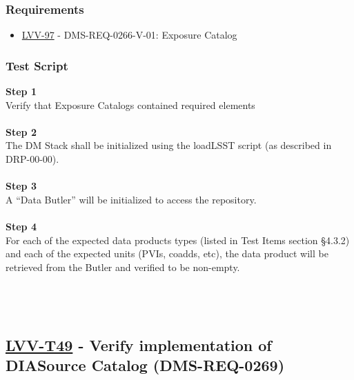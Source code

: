 \hypertarget{requirements-138}{%
\subsubsection{Requirements}\label{requirements-138}}

\begin{itemize}
\tightlist
\item
  \href{https://jira.lsstcorp.org/browse/LVV-97}{LVV-97} -
  DMS-REQ-0266-V-01: Exposure Catalog
\end{itemize}

\hypertarget{test-script-138}{%
\subsubsection{Test Script}\label{test-script-138}}

\textbf{Step 1}\\
Verify that Exposure Catalogs contained required elements\\
~\\
\textbf{Step 2}\\
The DM Stack shall be initialized using the loadLSST script (as
described in DRP-00-00).\\
~\\
\textbf{Step 3}\\
A ``Data Butler'' will be initialized to access the repository.\\
~\\
\textbf{Step 4}\\
For each of the expected data products types (listed in Test Items
section §4.3.2) and each of the expected units (PVIs, coadds, etc), the
data product will be retrieved from the Butler and verified to be
non-empty.\\
~\\
~\\
~\\

\hypertarget{lvv-t49---verify-implementation-of-diasource-catalog-dms-req-0269}{%
\subsection{\texorpdfstring{\href{https://jira.lsstcorp.org/secure/Tests.jspa\#/testCase/LVV-T49}{LVV-T49}
- Verify implementation of DIASource Catalog
(DMS-REQ-0269)}{LVV-T49 - Verify implementation of DIASource Catalog (DMS-REQ-0269)}}\label{lvv-t49---verify-implementation-of-diasource-catalog-dms-req-0269}}

